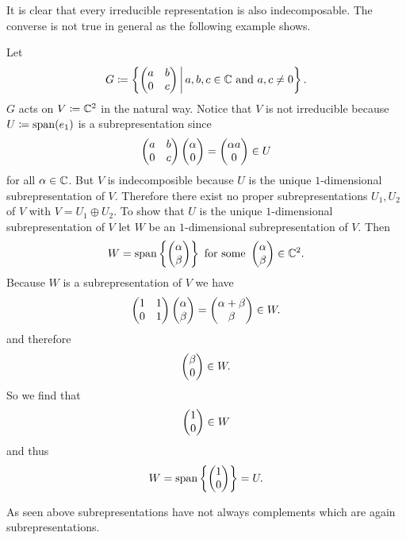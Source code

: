 It is clear that every irreducible representation is also indecomposable. The converse is not true in general as the following example shows.

\begin{expl}
  Let
  \[
    G \coloneqq \left\{ \begin{pmatrix}a&b\\0&c\end{pmatrix} \,\middle|\, a,b,c \in \mathbb{C} \text{ and } a, c \neq 0 \right\}.
  \]
  $G$ acts on $V \coloneqq \mathbb{C}^2$ in the natural way. Notice that $V$ is not irreducible because $U \coloneqq \operatorname{span}(e_1)$ is a subrepresentation since
  \[
    \begin{pmatrix}a&b\\0&c\end{pmatrix} \begin{pmatrix}\alpha\\0\end{pmatrix} = \begin{pmatrix}\alpha a\\0\end{pmatrix} \in U
  \]
  for all $\alpha \in \mathbb{C}$. But $V$ is indecomposible because $U$ is the unique $1$-dimensional subrepresentation of $V$.  Therefore there exist no proper subrepresentations $U_1, U_2$ of $V$ with $V = U_1 \oplus U_2$. To show that $U$ is the unique $1$-dimensional subrepresentation of $V$ let $W$ be an $1$-dimensional subrepresentation of $V$. Then
  \[
    W = \operatorname{span}\left\{ \begin{pmatrix}\alpha\\\beta\end{pmatrix} \right\} \text{ for some } \begin{pmatrix}\alpha\\\beta\end{pmatrix} \in \mathbb{C}^2.
  \]
  Because $W$ is a subrepresentation of $V$ we have
  \[
    \begin{pmatrix}1&1\\0&1\end{pmatrix} \begin{pmatrix}\alpha\\\beta\end{pmatrix} = \begin{pmatrix}\alpha+\beta\\\beta\end{pmatrix} \in W.
  \]
  and therefore
  \[
    \begin{pmatrix}\beta\\0\end{pmatrix} \in W.
  \]
  So we find that
  \[
    \begin{pmatrix}1\\0\end{pmatrix} \in W
  \]
  and thus
  \[
    W = \operatorname{span}\left\{\begin{pmatrix}1\\0\end{pmatrix}\right\} = U.
  \]
\end{expl}


\begin{warn}
  As seen above subrepresentations have not always complements which are again subrepresentations.
\end{warn}


